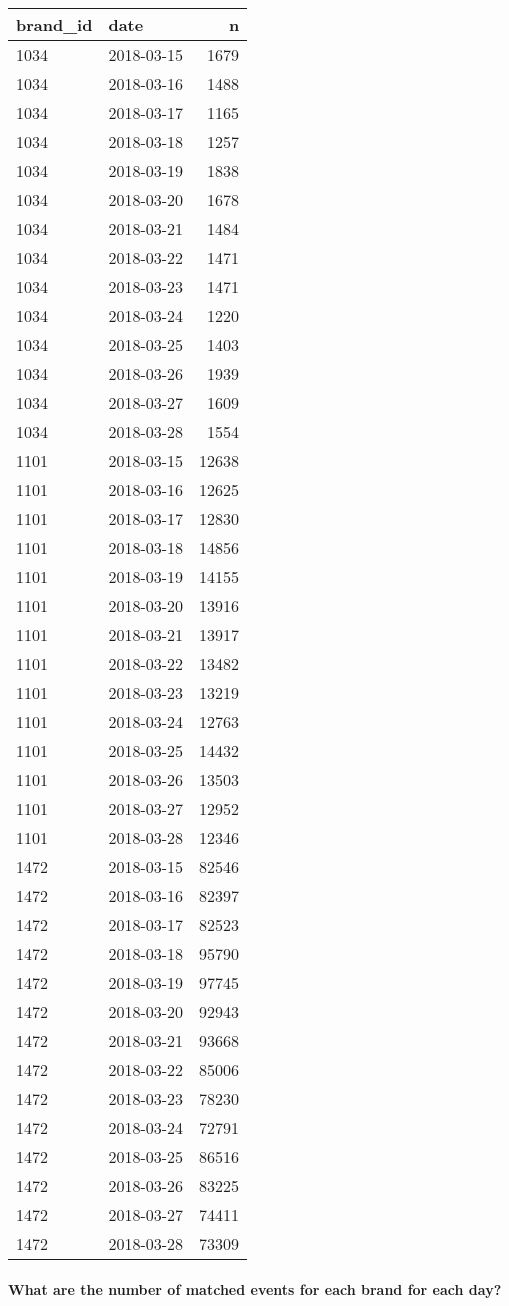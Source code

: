 \documentclass[]{article}
\newenvironment{Shaded}{\begin{snugshade}}{\end{snugshade}}
\newcommand{\KeywordTok}[1]{\textcolor[rgb]{0.13,0.29,0.53}{\textbf{#1}}}
\newcommand{\DataTypeTok}[1]{\textcolor[rgb]{0.13,0.29,0.53}{#1}}
\newcommand{\StringTok}[1]{\textcolor[rgb]{0.31,0.60,0.02}{#1}}
\newcommand{\CommentTok}[1]{\textcolor[rgb]{0.56,0.35,0.01}{\textit{#1}}}
\newcommand{\OperatorTok}[1]{\textcolor[rgb]{0.81,0.36,0.00}{\textbf{#1}}}
\newcommand{\NormalTok}[1]{#1}
\let\oldparagraph\paragraph
\renewcommand{\paragraph}[1]{\oldparagraph{#1}\mbox{}}
\begin{document}
\begin{longtable}[]{@{}llr@{}}
\toprule
brand\_id & date & n\tabularnewline
\midrule
\endhead
1034 & 2018-03-15 & 1679\tabularnewline
1034 & 2018-03-16 & 1488\tabularnewline
1034 & 2018-03-17 & 1165\tabularnewline
1034 & 2018-03-18 & 1257\tabularnewline
1034 & 2018-03-19 & 1838\tabularnewline
1034 & 2018-03-20 & 1678\tabularnewline
1034 & 2018-03-21 & 1484\tabularnewline
1034 & 2018-03-22 & 1471\tabularnewline
1034 & 2018-03-23 & 1471\tabularnewline
1034 & 2018-03-24 & 1220\tabularnewline
1034 & 2018-03-25 & 1403\tabularnewline
1034 & 2018-03-26 & 1939\tabularnewline
1034 & 2018-03-27 & 1609\tabularnewline
1034 & 2018-03-28 & 1554\tabularnewline
1101 & 2018-03-15 & 12638\tabularnewline
1101 & 2018-03-16 & 12625\tabularnewline
1101 & 2018-03-17 & 12830\tabularnewline
1101 & 2018-03-18 & 14856\tabularnewline
1101 & 2018-03-19 & 14155\tabularnewline
1101 & 2018-03-20 & 13916\tabularnewline
1101 & 2018-03-21 & 13917\tabularnewline
1101 & 2018-03-22 & 13482\tabularnewline
1101 & 2018-03-23 & 13219\tabularnewline
1101 & 2018-03-24 & 12763\tabularnewline
1101 & 2018-03-25 & 14432\tabularnewline
1101 & 2018-03-26 & 13503\tabularnewline
1101 & 2018-03-27 & 12952\tabularnewline
1101 & 2018-03-28 & 12346\tabularnewline
1472 & 2018-03-15 & 82546\tabularnewline
1472 & 2018-03-16 & 82397\tabularnewline
1472 & 2018-03-17 & 82523\tabularnewline
1472 & 2018-03-18 & 95790\tabularnewline
1472 & 2018-03-19 & 97745\tabularnewline
1472 & 2018-03-20 & 92943\tabularnewline
1472 & 2018-03-21 & 93668\tabularnewline
1472 & 2018-03-22 & 85006\tabularnewline
1472 & 2018-03-23 & 78230\tabularnewline
1472 & 2018-03-24 & 72791\tabularnewline
1472 & 2018-03-25 & 86516\tabularnewline
1472 & 2018-03-26 & 83225\tabularnewline
1472 & 2018-03-27 & 74411\tabularnewline
1472 & 2018-03-28 & 73309\tabularnewline
\bottomrule
\end{longtable}

\paragraph{What are the number of matched events for each brand for each
day?}\label{what-are-the-number-of-matched-events-for-each-brand-for-each-day}

\begin{Shaded}
\end{Shaded}
\end{document}
